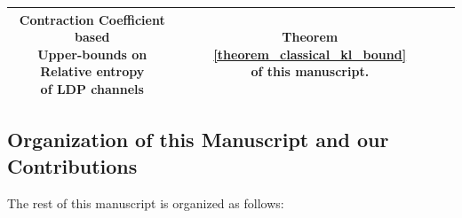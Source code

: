 \documentclass[onecolumn,ldraftcls, 11pt]{IEEEtran}
\begin{document}
\begin{table}[h]
\begin{center}
\begin{tabular}{|c|c|c|c|c|}
\hline
\makecell{Contraction Coefficient based \\ Upper-bounds on Relative entropy\\ of LDP channels } & & \makecell{Theorem \ref{theorem_classical_kl_bound} \\ of this manuscript.} & \cite[Proposition 3]{Nuradha25} & \\
\hline  
\end{tabular}
\end{center}
\end{table}

\subsection{Organization of this Manuscript and our Contributions}
The rest of this manuscript is organized as follows:
\end{document}
